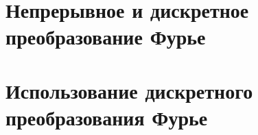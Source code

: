 \section{Непрерывное и дискретное преобразование Фурье}


\FloatBarrier
\section{Использование дискретного преобразования Фурье}
